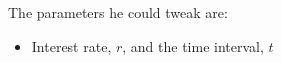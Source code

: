 \documentclass[preview]{standalone}
\begin{document}
\begin{center}
The parameters he could tweak are: \\ \begin{itemize} \item Interest rate, $r$, and the time interval, $t$  \end{itemize}
\end{center}
\end{document}

